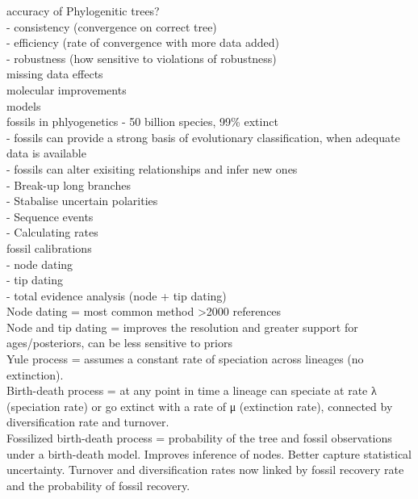 \documentclass[a4paper,11pt]{article}
\begin{document}
accuracy of Phylogenitic trees?\\
- consistency (convergence on correct tree)\\
- efficiency (rate of convergence with more data added)\\
- robustness (how sensitive to violations of robustness)\\

missing data effects\\

molecular improvements\\

models\\

fossils in phlyogenetics - 50 billion species, 99\% extinct \\
- fossils can provide a strong basis of evolutionary classification, when adequate data is available \\
- fossils can alter exisiting relationships and infer new ones\\
- Break-up long branches\\
- Stabalise uncertain polarities\\
- Sequence events\\
- Calculating rates\\

fossil calibrations\\
- node dating\\
- tip dating \\
- total evidence analysis (node + tip dating)\\

Node dating = most common method >2000 references\\
Node and tip dating = improves the resolution and greater support for ages/posteriors, can be less sensitive to priors\\

Yule process = assumes a constant rate of speciation across lineages (no extinction).\\

Birth-death process = at any point in time a lineage can speciate at rate λ (speciation rate) or go extinct with a rate of μ (extinction rate), connected by diversification rate and turnover.\\

Fossilized birth-death process = probability of the tree and fossil observations under a birth-death model. Improves inference of nodes. Better capture statistical uncertainty. Turnover and diversification rates now linked by fossil recovery rate and the probability of fossil recovery.\\
\end{document}
